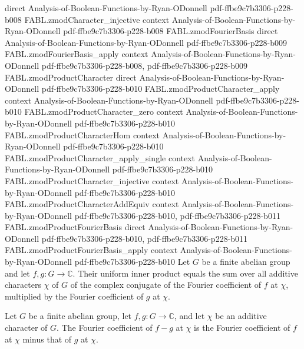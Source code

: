 \begin{theorem}
  {direct}
  {Analysis-of-Boolean-Functions-by-Ryan-ODonnell}
  {pdf-ffbe9c7b3306-p228-b008}
\proofstep
  {FABL.zmodCharacter_injective}
  {context}
  {Analysis-of-Boolean-Functions-by-Ryan-ODonnell}
  {pdf-ffbe9c7b3306-p228-b008}
\proofstep
  {FABL.zmodFourierBasis}
  {direct}
  {Analysis-of-Boolean-Functions-by-Ryan-ODonnell}
  {pdf-ffbe9c7b3306-p228-b009}
\proofstep
  {FABL.zmodFourierBasis_apply}
  {context}
  {Analysis-of-Boolean-Functions-by-Ryan-ODonnell}
  {pdf-ffbe9c7b3306-p228-b008,
    pdf-ffbe9c7b3306-p228-b009}
\proofstep
  {FABL.zmodProductCharacter}
  {direct}
  {Analysis-of-Boolean-Functions-by-Ryan-ODonnell}
  {pdf-ffbe9c7b3306-p228-b010}
\proofstep
  {FABL.zmodProductCharacter_apply}
  {context}
  {Analysis-of-Boolean-Functions-by-Ryan-ODonnell}
  {pdf-ffbe9c7b3306-p228-b010}
\proofstep
  {FABL.zmodProductCharacter_zero}
  {context}
  {Analysis-of-Boolean-Functions-by-Ryan-ODonnell}
  {pdf-ffbe9c7b3306-p228-b010}
\proofstep
  {FABL.zmodProductCharacterHom}
  {context}
  {Analysis-of-Boolean-Functions-by-Ryan-ODonnell}
  {pdf-ffbe9c7b3306-p228-b010}
\proofstep
  {FABL.zmodProductCharacter_apply_single}
  {context}
  {Analysis-of-Boolean-Functions-by-Ryan-ODonnell}
  {pdf-ffbe9c7b3306-p228-b010}
\proofstep
  {FABL.zmodProductCharacter_injective}
  {context}
  {Analysis-of-Boolean-Functions-by-Ryan-ODonnell}
  {pdf-ffbe9c7b3306-p228-b010}
\proofstep
  {FABL.zmodProductCharacterAddEquiv}
  {context}
  {Analysis-of-Boolean-Functions-by-Ryan-ODonnell}
  {pdf-ffbe9c7b3306-p228-b010,
    pdf-ffbe9c7b3306-p228-b011}
\proofstep
  {FABL.zmodProductFourierBasis}
  {direct}
  {Analysis-of-Boolean-Functions-by-Ryan-ODonnell}
  {pdf-ffbe9c7b3306-p228-b010,
    pdf-ffbe9c7b3306-p228-b011}
\proofstep
  {FABL.zmodProductFourierBasis_apply}
  {context}
  {Analysis-of-Boolean-Functions-by-Ryan-ODonnell}
  {pdf-ffbe9c7b3306-p228-b010}
Let $G$ be a finite abelian group and let $f,g:G\to\mathbb{C}$. Their uniform inner
product equals the sum over all additive characters $\chi$ of $G$ of the complex
conjugate of the Fourier coefficient of $f$ at $\chi$, multiplied by the Fourier
coefficient of $g$ at $\chi$.
\end{theorem}

\begin{theorem}
\label{FABL.abelianFourierCoeff_sub}
\leanok
{}
Let $G$ be a finite abelian group, let $f,g:G\to\mathbb{C}$, and let $\chi$ be an
additive character of $G$. The Fourier coefficient of $f-g$ at $\chi$ is the Fourier
coefficient of $f$ at $\chi$ minus that of $g$ at $\chi$.
\end{theorem}

